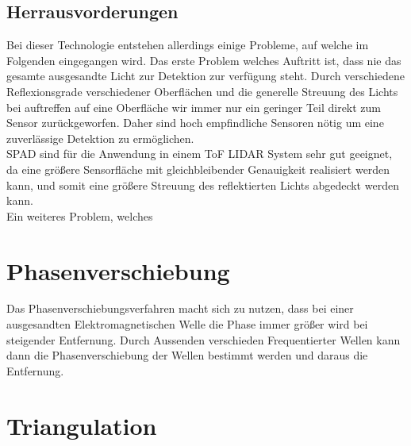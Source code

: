 \subsection{Herrausvorderungen}
Bei dieser Technologie entstehen allerdings einige Probleme, auf welche im Folgenden eingegangen wird. 
Das erste Problem welches Auftritt ist, dass nie das gesamte ausgesandte Licht zur Detektion zur verfügung steht. Durch verschiedene Reflexionsgrade verschiedener Oberflächen und die generelle Streuung des Lichts bei auftreffen auf eine Oberfläche wir immer nur ein geringer Teil direkt zum Sensor zurückgeworfen. Daher sind hoch empfindliche Sensoren nötig um eine zuverlässige Detektion zu ermöglichen.\\
\ac{SPAD} sind für die Anwendung in einem \ac{ToF} \ac{LIDAR} System sehr gut geeignet, da eine größere Sensorfläche mit gleichbleibender Genauigkeit realisiert werden kann, und somit eine größere Streuung des reflektierten Lichts abgedeckt werden kann.\\
Ein weiteres Problem, welches 

\section{Phasenverschiebung}  \label{sec:phasenverschiebung}
Das Phasenverschiebungsverfahren macht sich zu nutzen, dass bei einer ausgesandten Elektromagnetischen Welle die Phase immer größer wird bei steigender Entfernung. Durch Aussenden verschieden Frequentierter Wellen kann dann die Phasenverschiebung der Wellen bestimmt werden und daraus die Entfernung.\\
\section{Triangulation}
